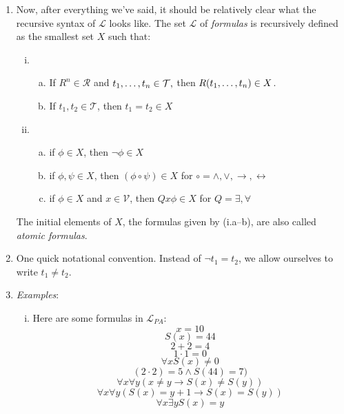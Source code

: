 \begin{enumerate}[\thesection.1]
 		\item Now, after everything we've said, it should be relatively clear what the recursive syntax of $\mathcal{L}$ looks like. The set $\mathcal{L}$ of \emph{formulas} is recursively defined as the smallest set $X$ such that:
		\begin{enumerate}[(i)]
		
			\item \begin{enumerate}[(a)]
			
				\item If $R^n\in\mathcal{R}$ and $t_1, \mathellipsis, t_n\in \mathcal{T},$ then $R(t_1, \mathellipsis, t_n)\in X$.
				
				\item If $t_1,t_2\in \mathcal{T}$, then $t_1=t_2\in X$
				
				\end{enumerate}
			
			\item \begin{enumerate}[(a)]
			
				\item if $\phi\in X$, then $\neg \phi\in X$
				
				\item if $\phi,\psi\in X$, then $(\phi\circ\psi)\in X$ for $\circ=\land,\lor,\to,\leftrightarrow$
				
				\item if $\phi\in X$ and $x\in \mathcal{V}$, then $Qx\phi\in X$ for $Q=\exists,\forall$
			
			\end{enumerate}
							
		\end{enumerate}
		
		The initial elements of $X$, the formulas given by (i.a--b), are also called \emph{atomic formulas}.

		
		\item One quick notational convention. Instead of $\neg{t_1=t_2}$, we allow ourselves to write $t_1\neq t_2$.
			
			\item \emph{Examples}:
			
				\begin{enumerate}[(i)]
				
					\item Here are some formulas in $\mathcal{L}_{PA}$:
					\[x=10\]
					\[S(x)=44\]
					\[2+2=4\]
					\[1\cdot1=0\]
					\[\forall x S(x)\neq 0\]
					\[(2\cdot 2)=5\land S(44)=7)\]
					\[\forall x\forall y(x\neq y\to S(x)\neq S(y))\]
					\[\forall x\forall y(S(x)=y+1\to S(x)=S(y))\]
					\[\forall x\exists yS(x)=y\]
					

\end{enumerate}
\end{enumerate}
